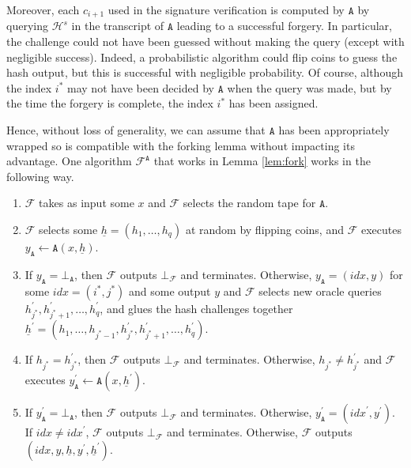 \documentclass{mrl}
\theoremstyle{plain}
\theoremstyle{definition}
\begin{document}
Moreover, each $c_{i+1}$ used in the signature verification is computed by $\texttt{A}$ by querying $\mathcal{H}^s$  in the transcript of $\texttt{A}$ leading to a successful forgery. In particular, the challenge could not have been guessed without making the query (except with negligible success). Indeed, a probabilistic algorithm could flip coins to guess the hash output, but this is successful with negligible probability. Of course, although the index $i^*$ may not have been decided by $\texttt{A}$ when the query was made, but by the time the forgery is complete, the index $i^*$ has been assigned.

Hence, without loss of generality, we can assume that $\texttt{A}$ has been appropriately wrapped so is compatible with the forking lemma without impacting its advantage. One algorithm $\mathcal{F}^\texttt{A}$ that works in Lemma \ref{lem:fork} works in the following way.

\begin{enumerate}
\item $\mathcal{F}$ takes as input some $x$ and $\mathcal{F}$ selects the random tape for $\texttt{A}$.
\item $\mathcal{F}$ selects some $\underline{h} = (h_1, \ldots, h_q)$ at random by flipping coins, and $\mathcal{F}$ executes $y_\texttt{A} \leftarrow \texttt{A}(x,\underline{h})$.
\item If $y_{\texttt{A}} = \bot_{\texttt{A}}$, then $\mathcal{F}$ outputs $\bot_{\mathcal{F}}$ and terminates. Otherwise, $y_{\texttt{A}} = (\textit{idx}, y)$ for some $\textit{idx}=(i^*,j^*)$ and some output $y$ and $\mathcal{F}$ selects new oracle queries $h_{j^*}^\prime, h_{j^*+1}^\prime, \ldots, h_q^\prime$, and glues the hash challenges together $\underline{h}^\prime = (h_1, \ldots, h_{j^*-1}, h_{j^*}^\prime, h_{j^*+1}^\prime, \ldots, h_q^\prime)$. 
\item If $h_{j^*} = h_{j^{*}}^\prime$, then $\mathcal{F}$ outputs $\bot_{\mathcal{F}}$ and terminates. Otherwise, $h_{j^*} \neq h_{j^{*}}^\prime$ and $\mathcal{F}$ executes $y_\texttt{A}^\prime \leftarrow \texttt{A}(x,\underline{h}^\prime)$.
\item If $y_{\texttt{A}}^\prime = \bot_{\texttt{A}}$, then $\mathcal{F}$ outputs $\bot_{\mathcal{F}}$ and terminates. Otherwise, $y_{\texttt{A}}^\prime = (\textit{idx}^{\prime}, y^\prime)$. If $\textit{idx} \neq \textit{idx}^\prime$, $\mathcal{F}$ outputs $\bot_{\mathcal{F}}$ and terminates. Otherwise, $\mathcal{F}$ outputs $(\textit{idx}, y, \underline{h}, y^\prime, \underline{h}^\prime)$.
\end{enumerate}
\end{document}
